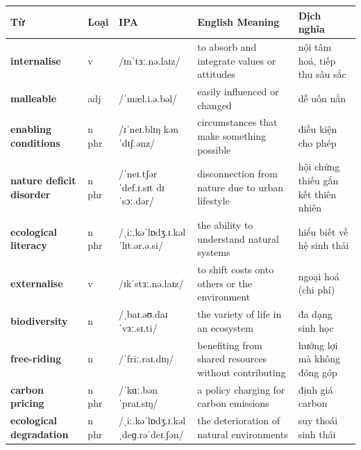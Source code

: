 \separator


\vspace{0.8em}
\begin{center}
\renewcommand{\arraystretch}{1.65}
\begin{tabularx}{\textwidth}{|V{0.22\textwidth}|C{0.07\textwidth}|I{0.20\textwidth}|Y|V{0.18\textwidth}|}
\hline
{}
\textbf{Từ} & \textbf{Loại} & \textbf{IPA} & \textbf{English Meaning} & \textbf{Dịch nghĩa} \\
\hline
\textbf{internalise} & v & /ɪnˈtɜː.nə.laɪz/ & to absorb and integrate values or attitudes & nội tâm hoá, tiếp thu sâu sắc \\ \hline
\textbf{malleable} & adj & /ˈmæl.i.ə.bəl/ & easily influenced or changed & dễ uốn nắn \\ \hline
\textbf{enabling conditions} & n phr & /ɪˈneɪ.blɪŋ kənˈdɪʃ.ənz/ & circumstances that make something possible & điều kiện cho phép \\ \hline
\textbf{nature deficit disorder} & n phr & /ˈneɪ.tʃər ˈdef.ɪ.sɪt dɪˈsɔː.dər/ & disconnection from nature due to urban lifestyle & hội chứng thiếu gắn kết thiên nhiên \\ \hline
\textbf{ecological literacy} & n phr & /ˌiː.kəˈlɒdʒ.ɪ.kəl ˈlɪt.ər.ə.si/ & the ability to understand natural systems & hiểu biết về hệ sinh thái \\ \hline
\textbf{externalise} & v & /ɪkˈstɜː.nə.laɪz/ & to shift costs onto others or the environment & ngoại hoá (chi phí) \\ \hline
\textbf{biodiversity} & n & /ˌbaɪ.əʊ.daɪˈvɜː.sɪ.ti/ & the variety of life in an ecosystem & đa dạng sinh học \\ \hline
\textbf{free-riding} & n & /ˈfriː.raɪ.dɪŋ/ & benefiting from shared resources without contributing & hưởng lợi mà không đóng góp \\ \hline
\textbf{carbon pricing} & n phr & /ˈkɑː.bən ˈpraɪ.sɪŋ/ & a policy charging for carbon emissions & định giá carbon \\ \hline
\textbf{ecological degradation} & n phr & /ˌiː.kəˈlɒdʒ.ɪ.kəl ˌdeɡ.rəˈdeɪ.ʃən/ & the deterioration of natural environments & suy thoái sinh thái \\ \hline
\end{tabularx}
\end{center}

\newpage

